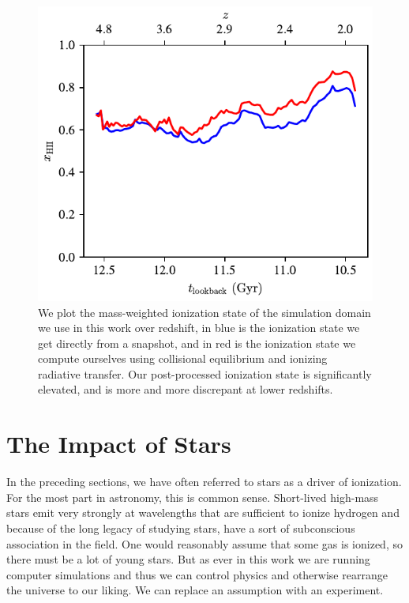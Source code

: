 \begin{figure}
    \centering
    \includegraphics[width=\textwidth,keepaspectratio]{figures/ionization_state.pdf}
    \caption{
        We plot the mass-weighted ionization state of the simulation domain we use in this work over redshift, in blue is the ionization state we get directly from a snapshot, and in red is the ionization state we compute ourselves using collisional equilibrium and ionizing radiative transfer.
        Our post-processed ionization state is significantly elevated, and is more and more discrepant at lower redshifts.
    }
    \label{fig:pre_post_ionization}
\end{figure}


\section{The Impact of Stars}

In the preceding sections, we have often referred to stars as a driver of ionization.
For the most part in astronomy, this is common sense.
Short-lived high-mass stars emit very strongly at wavelengths that are sufficient to ionize hydrogen and because of the long legacy of studying stars, have a sort of subconscious association in the field.
One would reasonably assume that some gas is ionized, so there must be a lot of young stars.
But as ever in this work we are running computer simulations and thus we can control physics and otherwise rearrange the universe to our liking.
We can replace an assumption with an experiment.

